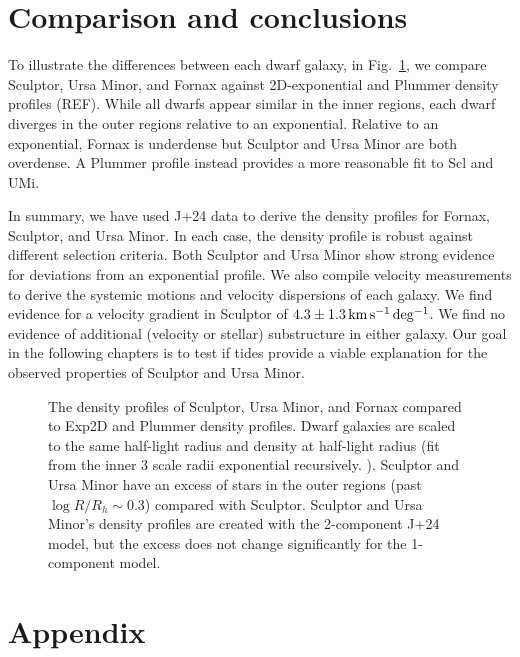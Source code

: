 \section{Comparison and conclusions}\label{comparison-and-conclusions}

To illustrate the differences between each dwarf galaxy, in
Fig.~\ref{fig:classical_dwarfs_densities}, we compare Sculptor, Ursa
Minor, and Fornax against 2D-exponential and Plummer density profiles
(REF). While all dwarfs appear similar in the inner regions, each dwarf
diverges in the outer regions relative to an exponential. Relative to an
exponential, Fornax is underdense but Sculptor and Ursa Minor are both
overdense. A Plummer profile instead provides a more reasonable fit to
Scl and UMi.

In summary, we have used J+24 data to derive the density profiles for
Fornax, Sculptor, and Ursa Minor. In each case, the density profile is
robust against different selection criteria. Both Sculptor and Ursa
Minor show strong evidence for deviations from an exponential profile.
We also compile velocity measurements to derive the systemic motions and
velocity dispersions of each galaxy. We find evidence for a velocity
gradient in Sculptor of \(4.3\pm1.3\,{\rm km\,s^{-1}\,deg^{-1}}\). We find no evidence of
additional (velocity or stellar) substructure in either galaxy. Our goal
in the following chapters is to test if tides provide a viable
explanation for the observed properties of Sculptor and Ursa Minor.

\begin{figure}
\centering
{}
\caption[Classical dwarf density profiles]{The density profiles of
Sculptor, Ursa Minor, and Fornax compared to Exp2D and Plummer density
profiles. Dwarf galaxies are scaled to the same half-light radius and
density at half-light radius (fit from the inner 3 scale radii
exponential recursively. ). Sculptor and Ursa Minor have an excess of
stars in the outer regions (past \(\log R/R_h \sim 0.3\)) compared with
Sculptor. Sculptor and Ursa Minor's density profiles are created with
the 2-component J+24 model, but the excess does not change significantly
for the 1-component model.}\label{fig:classical_dwarfs_densities}
\end{figure}

\section{Appendix}\label{appendix}

